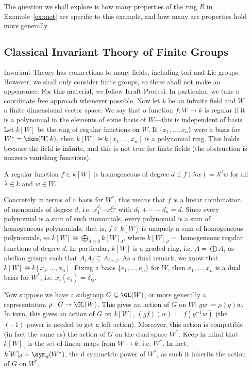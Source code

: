 The question we shall explore is how many properties of the ring $R$ in Example~\ref{ex:mot} are specific to this example, and how many are properties hold more generally. 



\subsection{Classical Invariant Theory of Finite Groups}

Invariant Theory has connections to many fields, including tori and Lie groups. However, we shall only consider finite groups, so these shall not make an appearance. For this material, we follow Kraft-Procesi. In particular, we take a coordinate free approach whenever possible. Now let $k$ be an infinite field and $W$ a finite dimensional vector space. We say that a function $f: W \to k$ is regular if it is a polynomial in the elements of some basis of $W$---this is independent of basis. Let $k[W]$ be the ring of regular functions on $W$. If $\{x_1,\ldots,x_n\}$ were a basis for $W^*=\Hom(W,k)$, then $k[W] \cong k[x_1,\ldots,x_n]$ is a polynomial ring. This holds because the field is infinite, and this is not true for finite fields (the obstruction is nonzero vanishing functions). 


\begin{dfn}
A regular function $f \in k[W]$ is homogeneous of degree $d$ if $f(\lambda w)=\lambda^d w$ for all $\lambda \in k$ and $w \in W$.
\end{dfn}

Concretely in terms of a basis for $W^*$, this means that $f$ is a linear combination of monomials of degree $d$, i.e. $x_1^{d_1} \cdots x_n^{d_n}$ with $d_1+\cdots+d_n=d$. Since every polynomial is a sum of such monomials, every polynomial is a sum of homogeneous polynomials; that is, $f \in k[W]$ is uniquely a sum of homogeneous polynomials, so $k[W] \cong \bigoplus_{d \geq 0} k[W]_d$, where $k[W]_d=$ homogeneous regular functions of degree $d$. In particular, $k[W]$ is a graded ring, i.e. $A= \bigoplus A_i$ as abelian groups such that $A_iA_j \subseteq A_{i+j}$. As a final remark, we know that $k[W] \cong k[x_1,\ldots,x_n]$. Fixing a basis $\{e_1,\ldots,e_n\}$ for $W$, then $x_1,\ldots,x_n$ is a dual basis for $W^*$, i.e. $x_i(e_j)= \delta_{ij}$. 


Now suppose we have a subgroup $G \subseteq \GL(W)$, or more generally a representation $\rho: G \to \GL(W)$. This gives an action of $G$ on $W$: $gw:=\rho(g)w$. In turn, this gives an action of $G$ on $k[W]$, $(gf)(w):=f(g^{-1}w)$ (the $(-1)$-power is needed to get a left action). Moreover, this action is compatible (in fact the same as) the action of $G$ on the dual space $W^*$. Keep in mind that $k[W]_1$ is the set of linear maps from $W \to k$, i.e. $W^*$. In fact, $k[W]_d= \sym_d(W^*)$, the d symmetric power of $W^*$, as such it inherits the action of $G$ on $W^*$. 


